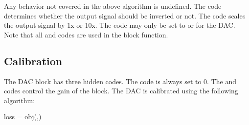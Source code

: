 Any behavior not covered in the above algorithm is undefined.
The  code determines whether the output signal should be inverted or
not. The  code scales the output signal by 1x or 10x. The 
code may only be set to  or  for the DAC. Note
that all \static and \dynamic codes are used in the block function.

\subsection{Calibration}
The DAC block has three hidden codes. The
 code is always set to $0$. The  and  codes
control the gain of the block. The DAC is calibrated using the following
algorithm:

\begin{algorithmic}
       \State loss = obj(,)
    \EndFor
  \EndFor
\end{algorithmic}
